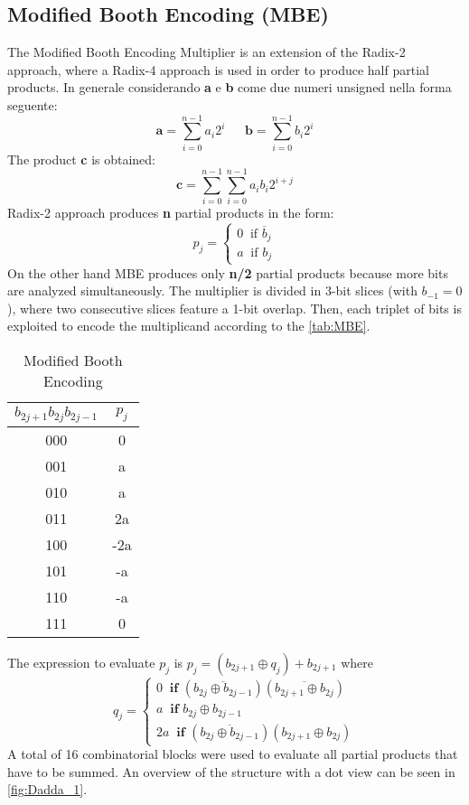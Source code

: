 \subsection{Modified Booth Encoding (MBE)}
The Modified Booth Encoding Multiplier is an extension of the Radix-2 approach, where a Radix-4 approach is used in order to produce half partial products. In generale considerando \textbf{a} e \textbf{b} come due numeri unsigned nella forma seguente:
$$
\textbf{a} = \sum_{i=0}^{n-1}a_i2^i\ \ \ \ \ \ \  \textbf{b} = \sum_{i=0}^{n-1}b_i2^i
$$
The product \textbf{c} is obtained:
$$
\textbf{c} = \sum_{i=0}^{n-1}\sum_{i=0}^{n-1}a_ib_i2^{i+j}
$$
Radix-2 approach produces \textbf{n} partial products in the form:
$$
p_j =
\begin{cases}
0 \ \textrm{  if   } \overline{b}_j\\
a \ \textrm{  if   } {b}_j
\end{cases}
$$
On the other hand MBE produces only \textbf{n/2} partial products because more bits are analyzed simultaneously. The multiplier is divided in 3-bit slices (with $b_{-1} = 0$), where two consecutive slices feature a 1-bit overlap. Then, each triplet of bits is exploited to encode the multiplicand according to the \autoref{tab:MBE}.
\begin{table}[htb]
	\centering
	\begin{tabular}{cc}
		$b_{2j+1}b_{2j}b_{2j-1}$ & $p_j$ \\
		\hline
		000 & 0 \\
		001 & a \\
		010 & a \\
		011 & 2a \\
		100 & -2a \\
		101 & -a \\
		110 & -a \\
		111 & 0 \\
	\end{tabular}
	\label{tab:MBE}
	\caption{Modified Booth Encoding}
\end{table}
The expression to evaluate $p_j$ is $p_j = (b_{2j+1} \oplus q_j) + b_{2j+1}$ where
$$ q_j=
\begin{cases}
0 \ \textbf{  if   } (\overline{b_{2j} \oplus b_{2j-1}})(\overline{b_{2j+1} \oplus b_{2j}})\\
a \ \textbf{  if   } b_{2j} \oplus b_{2j-1}\\
2a \ \textbf{  if   } (\overline{b_{2j} \oplus b_{2j-1}})(b_{2j+1} \oplus b_{2j})
\end{cases}
$$
A total of 16 combinatorial blocks were used to evaluate all partial products that have to be summed. An overview of the structure with a dot view can be seen in \autoref{fig:Dadda_1}.

